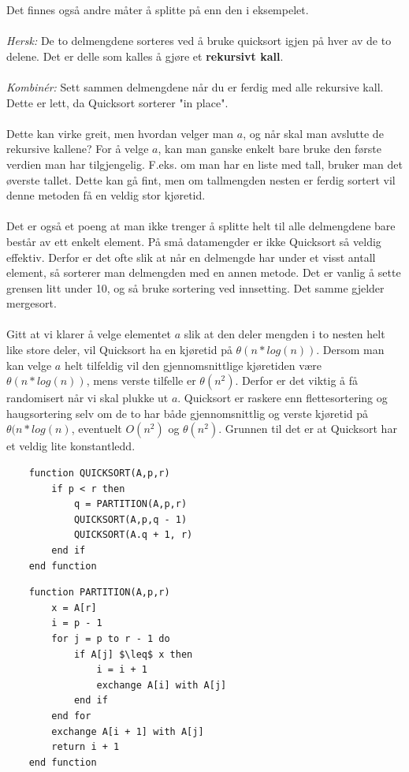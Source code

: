 \noindent Det finnes også andre måter å splitte på enn den i eksempelet.
\\\\
\textit{Hersk:} De to delmengdene sorteres ved å bruke quicksort igjen på hver av de to delene. Det er delle som kalles å gjøre et \textbf{rekursivt kall}.
\\\\
\textit{Kombinér:} Sett sammen delmengdene når du er ferdig med alle rekursive kall. Dette er lett, da Quicksort sorterer "in place".
\\\\
Dette kan virke greit, men hvordan velger man $a$, og når skal man avslutte de rekursive kallene? For å velge $a$, kan man ganske enkelt bare bruke den første verdien man har tilgjengelig. F.eks. om man har en liste med tall, bruker man det øverste tallet. Dette kan gå fint, men om tallmengden nesten er ferdig sortert vil denne metoden få en veldig stor kjøretid.
\\\\
Det er også et poeng at man ikke trenger å splitte helt til alle delmengdene bare består av ett enkelt element. På små datamengder er ikke Quicksort så veldig effektiv. Derfor er det ofte slik at når en delmengde har under et visst antall element, så sorterer man delmengden med en annen metode. Det er vanlig å sette grensen litt under 10, og så bruke sortering ved innsetting. Det samme gjelder mergesort.
\\\\
Gitt at vi klarer å velge elementet $a$ slik at den deler mengden i to nesten helt like store deler, vil Quicksort ha en kjøretid på \textbf{$\theta(n * log(n))$}. Dersom man kan velge $a$ helt tilfeldig vil den gjennomsnittlige kjøretiden være \textbf{$\theta(n * log(n))$}, mens verste tilfelle er $\theta(n^2)$. Derfor er det viktig å få randomisert når vi skal plukke ut $a$. Quicksort er raskere enn flettesortering og haugsortering selv om de to har både gjennomsnittlig og verste kjøretid på $\theta(n * log(n)$, eventuelt $O(n^2)$ og $\theta (n^2)$. Grunnen til det er at Quicksort har et veldig lite konstantledd.

\begin{lstlisting}
    function QUICKSORT(A,p,r)
    	if p < r then
    		q = PARTITION(A,p,r)
    		QUICKSORT(A,p,q - 1)
    		QUICKSORT(A.q + 1, r)
    	end if
    end function
\end{lstlisting}

\begin{lstlisting}
    function PARTITION(A,p,r)
	    x = A[r]
    	i = p - 1
    	for j = p to r - 1 do
    		if A[j] $\leq$ x then
    			i = i + 1
    			exchange A[i] with A[j]
    		end if
    	end for
    	exchange A[i + 1] with A[j]
    	return i + 1
    end function
\end{lstlisting}

